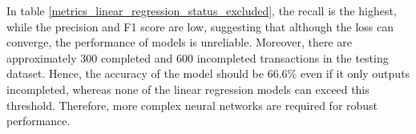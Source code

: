 \documentclass[12pt,twoside]{report}
\begin{document}
In table \ref{metrics_linear_regression_status_excluded}, the recall is the highest, while the precision and F1 score are low, suggesting that although the loss can converge, the performance of models is unreliable. Moreover, there are approximately 300 completed and 600 incompleted transactions in the testing dataset. Hence, the accuracy of the model should be 66.6\% even if it only outputs incompleted, whereas none of the linear regression models can exceed this threshold. Therefore, more complex neural networks are required for robust performance. 
\\

\begin{figure}[!htbp]
	\centering
	\hfill
	\hfill
	\hfil

\end{figure}
\end{document}
